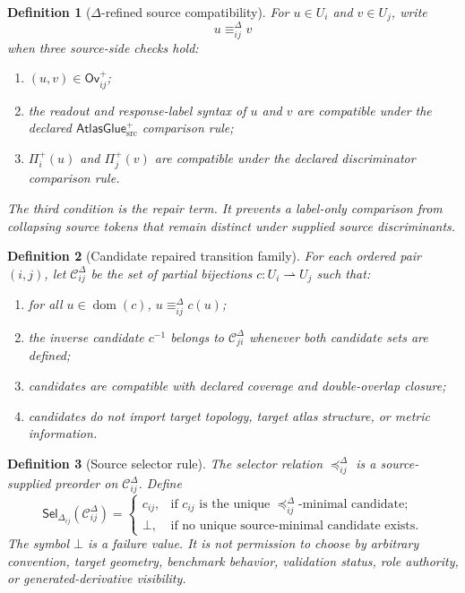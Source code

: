 \documentclass[11pt]{article}
\newcommand{\AtlasGlue}{\mathsf{AtlasGlue}_{\mathrm{src}}^{+}}
\newcommand{\Ov}{\mathsf{Ov}^{+}}
\newcommand{\Prof}{\Pi^{+}}
\newcommand{\Cand}{\mathcal{C}^{\Delta}}
\newcommand{\Sel}{\mathsf{Sel}_{\Delta}}
\newtheorem{definition}{Definition}
\begin{document}
\begin{definition}[\(\Delta\)-refined source compatibility]
For \(u\in U_i\) and \(v\in U_j\), write
\[
  u\equiv_{ij}^{\Delta}v
\]
when three source-side checks hold:
\begin{enumerate}
  \item \((u,v)\in\Ov_{ij}\);
  \item the readout and response-label syntax of \(u\) and \(v\) are
  compatible under the declared \(\AtlasGlue\) comparison rule;
  \item \(\Prof_i(u)\) and \(\Prof_j(v)\) are compatible under the declared
  discriminator comparison rule.
\end{enumerate}
The third condition is the repair term. It prevents a label-only comparison
from collapsing source tokens that remain distinct under supplied source
discriminants.
\end{definition}

\begin{definition}[Candidate repaired transition family]
For each ordered pair \((i,j)\), let \(\Cand_{ij}\) be the set of partial
bijections \(c:U_i\rightharpoonup U_j\) such that:
\begin{enumerate}
  \item for all \(u\in\operatorname{dom}(c)\), \(u\equiv_{ij}^{\Delta}c(u)\);
  \item the inverse candidate \(c^{-1}\) belongs to \(\Cand_{ji}\) whenever
  both candidate sets are defined;
  \item candidates are compatible with declared coverage and double-overlap
  closure;
  \item candidates do not import target topology, target atlas structure, or
  metric information.
\end{enumerate}
\end{definition}

\begin{definition}[Source selector rule]
The selector relation \(\preceq_{ij}^{\Delta}\) is a source-supplied preorder
on \(\Cand_{ij}\). Define
\[
  \Sel_{ij}(\Cand_{ij}) =
  \begin{cases}
    c_{ij}, & \text{if \(c_{ij}\) is the unique \(\preceq_{ij}^{\Delta}\)-minimal candidate;}\\
    \bot, & \text{if no unique source-minimal candidate exists.}
  \end{cases}
\]
The symbol \(\bot\) is a failure value. It is not permission to choose by
arbitrary convention, target geometry, benchmark behavior, validation status,
role authority, or generated-derivative visibility.
\end{definition}
\end{document}
